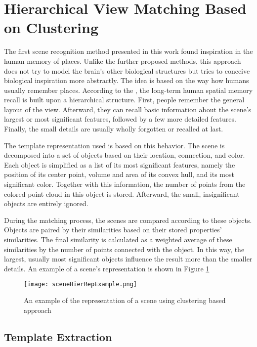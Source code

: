 \section{Hierarchical View Matching Based on Clustering}\label{section:hierarchical}

The first scene recognition method presented in this work found inspiration in the human memory of places. Unlike the further proposed methods, this approach does not try to model the brain's other biological structures but tries to conceive biological inspiration more abstractly. The idea is based on the way how humans usually remember places. According to the \cite{memoryHier}, the long-term human spatial memory recall is built upon a hierarchical structure. First, people remember the general layout of the view. Afterward, they can recall basic information about the scene's largest or most significant features, followed by a few more detailed features. Finally, the small details are usually wholly forgotten or recalled at last.\par
The template representation used is based on this behavior. The scene is decomposed into a set of objects based on their location, connection, and color. Each object is simplified as a list of its most significant features, namely the position of its center point, volume and area of its convex hull, and its most significant color. Together with this information, the number of points from the colored point cloud in this object is stored. Afterward, the small, insignificant objects are entirely ignored.\par
During the matching process, the scenes are compared according to these objects. Objects are paired by their similarities based on their stored properties' similarities. The final similarity is calculated as a weighted average of these similarities by the number of points connected with the object. In this way, the largest, usually most significant objects influence the result more than the smaller details. An example of a scene's representation is shown in Figure \ref{fig:sceneHierRepExample} \par

\begin{figure}[htpb]
    \centering
    \texttt{[image: sceneHierRepExample.png]}
    \caption{An example of the representation of a scene using clustering based approach} \label{fig:sceneHierRepExample}
\end{figure}

\subsection{Template Extraction}

